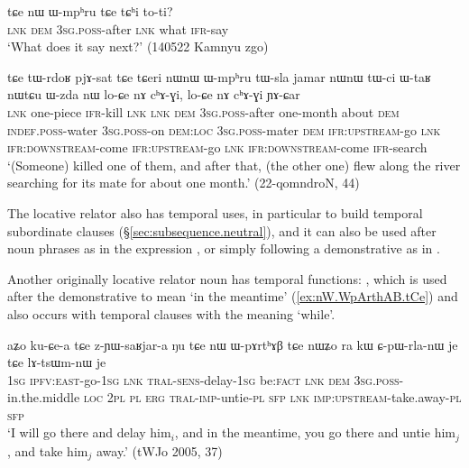 \begin{exe}
\ex \label{ex:nW.Wmphru.tCe}
 \gll  tɕe nɯ ɯ-mpʰru tɕe tɕʰi to-ti? \\
 \textsc{lnk} \textsc{dem} \textsc{3sg}.\textsc{poss}-after \textsc{lnk} what \textsc{ifr}-say \\
\glt `What does it say next?' (140522 Kamnyu zgo)
\end{exe}

\begin{exe}
\ex \label{ex:nWnW.Wmphru.tWsla}
 \gll tɕe tɯ-rdoʁ pjɤ-sat tɕe tɕeri nɯnɯ ɯ-mpʰru tɯ-sla jamar nɯnɯ tɯ-ci ɯ-taʁ nɯtɕu ɯ-zda nɯ lo-ɕe nɤ cʰɤ-ɣi, lo-ɕe nɤ cʰɤ-ɣi ɲɤ-ɕar \\
\textsc{lnk} one-piece \textsc{ifr}-kill \textsc{lnk} \textsc{lnk} \textsc{dem} \textsc{3sg}.\textsc{poss}-after one-month about \textsc{dem} \textsc{indef}.\textsc{poss}-water \textsc{3sg}.\textsc{poss}-on \textsc{dem}:\textsc{loc} \textsc{3sg}.\textsc{poss}-mater \textsc{dem} \textsc{ifr}:\textsc{upstream}-go \textsc{lnk} \textsc{ifr}:\textsc{downstream}-come  \textsc{ifr}:\textsc{upstream}-go \textsc{lnk} \textsc{ifr}:\textsc{downstream}-come \textsc{ifr}-search \\
\glt `(Someone) killed one of them, and after that, (the other one) flew along the river searching for its mate for about one month.' (22-qomndroN, 44)
\end{exe}

The locative relator  also has temporal uses, in particular to build temporal subordinate clauses (§\ref{sec:subsequence.neutral}), and it can also be used after noun phrases as in the expression , or simply following a demonstrative as in .

Another originally locative relator noun has temporal functions: , which is used after the demonstrative  to mean `in the meantime'  (\ref{ex:nW.WpArthAB.tCe}) and also occurs with temporal clauses with the meaning `while'.

\begin{exe}
\ex \label{ex:nW.WpArthAB.tCe}
\gll aʑo ku-ɕe-a tɕe z-ɲɯ-saʁjar-a ŋu tɕe nɯ ɯ-pɤrtʰɤβ tɕe nɯʑo ra kɯ ɕ-pɯ-rla-nɯ je tɕe lɤ-tsɯm-nɯ je \\
\textsc{1sg} \textsc{ipfv}:\textsc{east}-go-\textsc{1sg} \textsc{lnk} \textsc{tral}-\textsc{sens}-delay-\textsc{1sg} be:\textsc{fact} \textsc{lnk} \textsc{dem} \textsc{3sg}.\textsc{poss}-in.the.middle \textsc{loc} \textsc{2pl} \textsc{pl} \textsc{erg} \textsc{tral}-\textsc{imp}-untie-\textsc{pl} \textsc{sfp} \textsc{lnk} \textsc{imp}:\textsc{upstream}-take.away-\textsc{pl} \textsc{sfp} \\
\glt `I will go there and delay him$_i$, and in the meantime, you go there and untie him$_j$, and take him$_j$ away.' (tWJo 2005, 37)
\end{exe}

